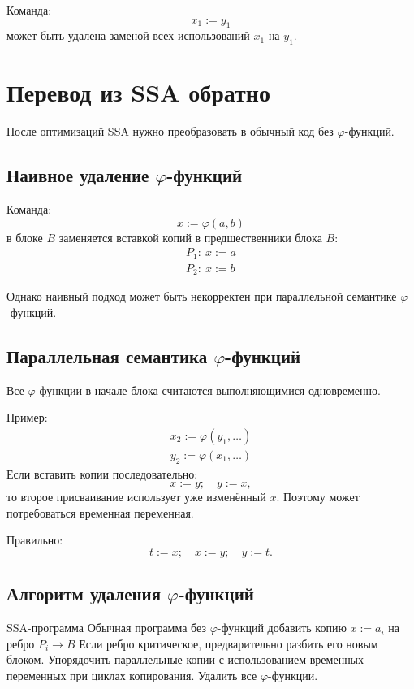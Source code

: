 \documentclass[12pt,a4paper]{article}
\begin{document}
Команда:
\[
x_1:=y_1
\]
может быть удалена заменой всех использований $x_1$ на $y_1$.

\section{Перевод из SSA обратно}

После оптимизаций SSA нужно преобразовать в обычный код без $\varphi$-функций.

\subsection{Наивное удаление $\varphi$-функций}

Команда:
\[
x := \varphi(a,b)
\]
в блоке $B$ заменяется вставкой копий в предшественники блока $B$:
\[
\begin{array}{l}
P_1:\ x:=a\\
P_2:\ x:=b
\end{array}
\]

Однако наивный подход может быть некорректен при параллельной семантике $\varphi$-функций.

\subsection{Параллельная семантика $\varphi$-функций}

Все $\varphi$-функции в начале блока считаются выполняющимися одновременно.

Пример:
\[
\begin{array}{l}
x_2:=\varphi(y_1,\ldots)\\
y_2:=\varphi(x_1,\ldots)
\end{array}
\]
Если вставить копии последовательно:
\[
x:=y;\quad y:=x,
\]
то второе присваивание использует уже изменённый $x$. Поэтому может потребоваться временная переменная.

Правильно:
\[
t:=x;\quad x:=y;\quad y:=t.
\]

\subsection{Алгоритм удаления $\varphi$-функций}

\begin{algorithm}[H]
\caption{Удаление $\varphi$-функций}
\begin{algorithmic}[1]
\Require SSA-программа
\Ensure Обычная программа без $\varphi$-функций
            \State добавить копию $x:=a_i$ на ребро $P_i\to B$
        \EndFor
    \EndFor
\EndFor
\State Если ребро критическое, предварительно разбить его новым блоком.
\State Упорядочить параллельные копии с использованием временных переменных при циклах копирования.
\State Удалить все $\varphi$-функции.
\end{algorithmic}
\end{algorithm}
\end{document}
